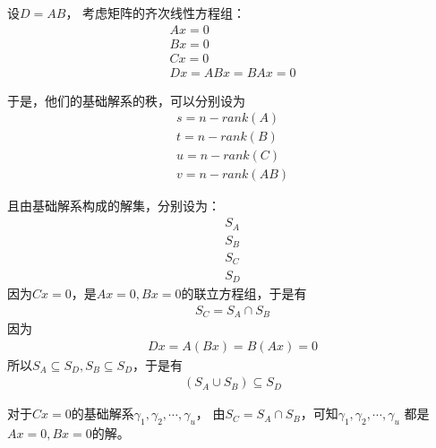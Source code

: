 \documentclass{article}
\begin{document}
设$D = AB$，
考虑矩阵的齐次线性方程组：
\begin{align*}
  A x = 0 \\
  B x = 0 \\
  C x = 0 \\
  D x = AB x = BA x = 0
\end{align*}

于是，他们的基础解系的秩，可以分别设为
\begin{align*}
  s = n - rank(A) \\
  t = n - rank(B) \\
  u = n - rank(C) \\
  v = n - rank(AB)
\end{align*}

且由基础解系构成的解集，分别设为：
\begin{align*}
  S_A \\
  S_B \\
  S_C \\
  S_D
\end{align*}
因为$Cx = 0$，是$Ax = 0, Bx = 0$的联立方程组，于是有
\begin{align*}
  S_C = S_A \cap S_B
\end{align*}
因为
\begin{align*}
  Dx = A(Bx) = B(Ax) = 0
\end{align*}
所以$S_A \subseteq S_D, S_B \subseteq S_D$，于是有
\begin{align*}
  (S_A \cup S_B) \subseteq S_D
\end{align*}

对于$Cx = 0$的基础解系$\gamma_1,\gamma_2,\cdots,\gamma_u$，
由$S_C = S_A \cap S_B$，可知$\gamma_1,\gamma_2,\cdots,\gamma_u$
都是$Ax = 0, Bx = 0$的解。
\end{document}

